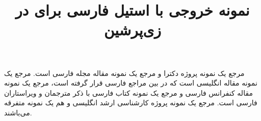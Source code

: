 \documentclass[11pt,a4paper]{article}
\title{نمونه خروجی با استیل فارسی \lr{unsrt-fa} برای \lr{BibTeX} در زی‌پرشین}
\author{}\date{}
\begin{document}
\maketitle

مرجع \cite{Omidali82phdThesis} یک نمونه پروژه دکترا و مرجع\cite{Abadi87} یک نمونه مقاله مجله فارسی است.
مرجع \cite{Baker02limits} یک نمونه مقاله انگلیسی است که در بین مراجع فارسی قرار گرفته است، مرجع \cite{Amintoosi87afzayesh}  یک نمونه  مقاله کنفرانس فارسی و
مرجع \cite{Pedram80osool} یک نمونه کتاب فارسی با ذکر مترجمان و ویراستاران فارسی است. مرجع \cite{Khalighi07MscThesis} یک نمونه پروژه کارشناسی ارشد انگلیسی و
\cite{Khalighi87xepersian} هم یک نمونه متفرقه  می‌باشند.

{\small


}
\end{document}
